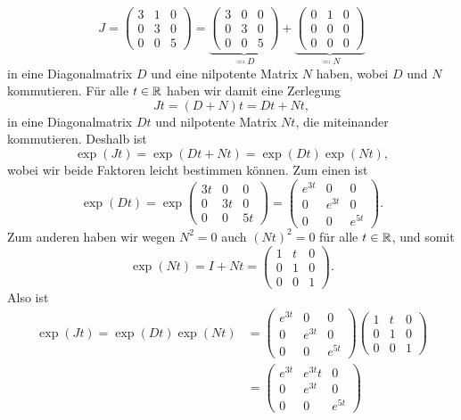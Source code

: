 \documentclass[a4paper, 10pt]{scrartcl}
\begin{document}
\[
  J
  =
  \begin{pmatrix}
    3 & 1 & 0 \\
    0 & 3 & 0 \\
    0 & 0 & 5
  \end{pmatrix}
  =
  \underbrace{
  \begin{pmatrix}
    3 & 0 & 0 \\
    0 & 3 & 0 \\
    0 & 0 & 5
  \end{pmatrix}
  }_{\eqqcolon D}
  +
  \underbrace{
  \begin{pmatrix}
    0 & 1 & 0 \\
    0 & 0 & 0 \\
    0 & 0 & 0
  \end{pmatrix}
  }_{\eqqcolon N}
\]
in eine Diagonalmatrix $D$ und eine nilpotente Matrix $N$ haben, wobei $D$ und $N$ kommutieren.
Für alle $t \in \mathbb{R}$ haben wir damit eine Zerlegung
\[
  Jt
  = (D + N)t
  = Dt + Nt,
\]
in eine Diagonalmatrix $Dt$ und nilpotente Matrix $Nt$, die miteinander kommutieren.
Deshalb ist
\[
    \exp(Jt)
  = \exp(Dt + Nt)
  = \exp(Dt) \exp(Nt),
\]
wobei wir beide Faktoren leicht bestimmen können.
Zum einen ist
\[
  \exp(Dt)
  =
  \exp
  \begin{pmatrix}
    3t  & 0   & 0 \\
    0   & 3t  & 0 \\
    0   & 0   & 5t
  \end{pmatrix}
  =
  \begin{pmatrix}
    e^{3t}  & 0       & 0       \\
    0       & e^{3t}  & 0       \\
    0       & 0       & e^{5t}
  \end{pmatrix}.
\]
Zum anderen haben wir wegen $N^2 = 0$ auch $(Nt)^2 = 0$ für alle $t \in \mathbb{R}$, und somit
\[
  \exp(Nt)
  =
  I + Nt
  =
  \begin{pmatrix}
    1 & t & 0 \\
    0 & 1 & 0 \\
    0 & 0 & 1
  \end{pmatrix}.
\]
Also ist
\begin{align*}
      \exp(Jt)
   =  \exp(Dt) \exp(Nt)
  &=
  \begin{pmatrix}
    e^{3t}  & 0       & 0       \\
    0       & e^{3t}  & 0       \\
    0       & 0       & e^{5t}
  \end{pmatrix}
  \begin{pmatrix}
    1 & t & 0 \\
    0 & 1 & 0 \\
    0 & 0 & 1
  \end{pmatrix} \\
  &=
  \begin{pmatrix}
    e^{3t}  & e^{3t} t  & 0       \\
    0       & e^{3t}    & 0       \\
    0       & 0         & e^{5t}
  \end{pmatrix}
\end{align*}
\end{document}
